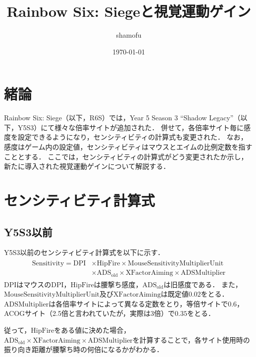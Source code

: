 \documentclass[uplatex, dvipdfmx, ja=standard, a4paper]{bxjsarticle}
\title{Rainbow Six: Siegeと視覚運動ゲイン}
\author{shamofu}
\date{\today}
\begin{document}
\maketitle

\section{緒論}
Rainbow Six: Siege（以下，R6S）では，Year 5 Season 3 ``Shadow Legacy''（以下，Y5S3）にて様々な倍率サイトが追加された．
併せて，各倍率サイト毎に感度を設定できるようになり，センシティビティの計算式も変更された．
なお，感度はゲーム内の設定値，センシティビティはマウスとエイムの比例定数を指すこととする．
ここでは，センシティビティの計算式がどう変更されたか示し，新たに導入された視覚運動ゲインについて解説する．

\section{センシティビティ計算式}
\subsection{Y5S3以前}
Y5S3以前のセンシティビティ計算式を以下に示す．
\begin{align}
  \begin{split}
    \mathrm{Sensitivity} = \mathrm{DPI} &\times \mathrm{HipFire} \times \mathrm{MouseSensitivityMultiplierUnit} \\
    &\times \mathrm{ADS}_{\mathrm{old}} \times \mathrm{XFactorAiming} \times \mathrm{ADSMultiplier}
  \end{split}
  \label{oldsensi}
\end{align}
\(\mathrm{DPI}\)はマウスのDPI，\(\mathrm{HipFire}\)は腰撃ち感度，\(\mathrm{ADS}_{\mathrm{old}}\)は旧感度である．
また，\(\mathrm{MouseSensitivityMultiplierUnit}\)及び\(\mathrm{XFactorAiming}\)は既定値\(0.02\)をとる．
\(\mathrm{ADSMultiplier}\)は各倍率サイトによって異なる定数をとり，等倍サイトで\(0.6\)，ACOGサイト（2.5倍と言われていたが，実際は3倍）で\(0.35\)をとる．

従って，\(\mathrm{HipFire}\)をある値に決めた場合，\(\mathrm{ADS}_{\mathrm{old}} \times \mathrm{XFactorAiming} \times \mathrm{ADSMultiplier}\)を計算することで，各サイト使用時の振り向き距離が腰撃ち時の何倍になるかがわかる．
\end{document}
